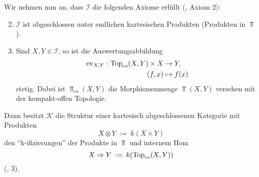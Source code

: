 Wir nehmen nun an, dass $\mathcal{I}$ die folgenden Axiome erfüllt
(\cite{Vogt}, Axiom 2):
\begin{enumerate}
  \setcounter{enumi}{1}
  \item \label{itm:k-axiom-prod} $\mathcal{I}$ ist abgeschlossen unter
    endlichen kartesischen Produkten (Produkten in $\Top$).
  \item \label{itm:k-axiom-ev} Sind $X, Y \in \mathcal{I}$, so ist die
    Auswertungsabbildung
    \begin{align*}
      \operatorname{ev}_{X, Y}: \operatorname{Top}_{co}(X, Y) \times X &\to Y, \\
      (f, x) &\mapsto f(x)
    \end{align*}
    stetig. Dabei ist $\Top_{co}(X, Y)$ die Morphismenmenge $\Top(X,
    Y)$ versehen mit der kompakt-offen Topologie.
\end{enumerate}
Dann besitzt $\mathcal{K}$ die Struktur einer kartesisch
abgeschlossenen Kategorie mit Produkten
\[ X \otimes Y \: := \: k(X \times Y) \]
den ``k-ifizierungen'' der Produkte in $\Top$ und internem Hom
\[ X \Rightarrow Y \: := \: k(\operatorname{Top}_{co}(X, Y)) \] 
(\cite{Vogt}, 3).

